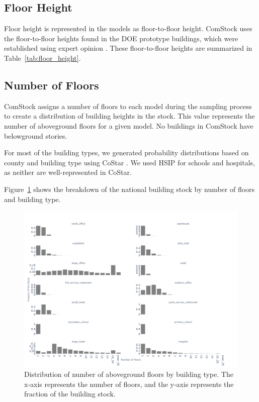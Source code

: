 \subsection{Floor Height}
Floor height is represented in the models as floor-to-floor height. ComStock uses the floor-to-floor heights found in the DOE prototype buildings, which were established using expert opinion \citep{deru_2011}. These floor-to-floor heights are summarized in Table~\ref{tab:floor_height}.



\pagebreak

\subsection{Number of Floors}
ComStock assigns a number of floors to each model during the sampling process to create a distribution of building heights in the stock. This value represents the number of aboveground floors for a given model. No buildings in ComStock have belowground stories.

 For most of the building types, we generated probability distributions based on county and building type using CoStar \citep{costar}. We used HSIP \citep{hsip} for schools and hospitals, as neither are well-represented in CoStar.
 
 Figure~\ref{fig:nfloors_dist} shows the breakdown of the national building stock by number of floors and building type.

\begin{figure}[H]
    \centering \includegraphics[width=1.0\textwidth]{figures/nfloors.png}
    \caption[Distribution of number of aboveground  floors by building type]{Distribution of number of aboveground  floors by building type. The x-axis represents the number of floors, and the y-axis represents the fraction of the building stock.}
    \label{fig:nfloors_dist}
\end{figure}

